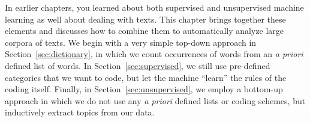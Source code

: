 In earlier chapters, you learned about both supervised and unsupervised machine learning as well about dealing with texts.
This chapter brings together these elements and discusses how to combine them to automatically analyze large corpora of texts. We begin with a very simple top-down approach in Section~\ref{sec:dictionary}, in which we count occurrences of words from an \emph{a priori} defined list of words. In Section~\ref{sec:supervised}, we still use pre-defined categories that we want to code, but let the machine ``learn'' the rules of the coding itself. Finally, in Section~\ref{sec:unsupervised}, we employ a bottom-up approach in which we do not use any \emph{a priori} defined lists or coding schemes, but inductively extract topics from our data.









